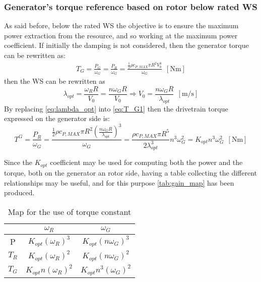 \subsubsection[Below rated WS]{Generator's torque reference based on rotor below rated WS}\label{subsec:below_rotor}
As said before, below the rated WS the objective is to ensure the maximum power extraction from the resource, and so working at the maximum power coefficient. If initially the damping is not considered, then the generator torque can be rewritten as:
\begin{gather}
    T_G=\frac{P_G}{\omega_G}=\frac{P_R}{\omega_G}=\frac{\frac{1}{2}\rho c_{P,MAX} \pi R^2 V_0^3}{\omega_G} \ \ \left[\si{\newton\meter}\right]
    \label{eq:T_G1}
\end{gather}
then the \acrshort{WS} can be rewritten as
\begin{equation}
    \lambda_{opt} = \frac{\omega_R R}{V_0} = \frac{n \omega_G R}{V_0} \Rightarrow V_0=\frac{n\omega_G R}{\lambda_{opt}}  \ \ \left[\si{\meter\per\second}\right]
    \label{eq:lambda_opt}
\end{equation}
By replacing \autoref{eq:lambda_opt} into \autoref{eq:T_G1} then the drivetrain torque expressed on the generator side is:
\begin{equation}
    T^G=\frac{P_R}{\omega_G}=\frac{\frac{1}{2}\rho c_{P,MAX} \pi R^2 \left(\frac{n\omega_G R}{\lambda_{opt}}\right)^3}{\omega_G} = \frac{\rho c_{P, MAX} \pi R^5 }{2 \lambda_{opt}^3}n^3\omega_G^{2} = K_{opt}n^3\omega_G^{2}  \ \ \left[\si{\newton\meter}\right]
    \label{eq:T_G2}
\end{equation}

Since the $K_{opt}$ coefficient may be used for computing both the power and the torque, both on the generator an rotor side, having a table collecting the different relationships may be useful, and for this purpose \autoref{tab:gain_map} has been produced.
\begin{table}[htb]
    \centering
    \caption{Map for the use of torque constant}
    \begin{tabular}{ccc}
    \toprule
         & $\omega_R$ & $\omega_G$  \\ \midrule
         P & $K_{opt} \left(\omega_{R}\right)^3$ & $K_{opt}\left(n \omega_{G}\right)^3$\\
         $T_R$ & $K_{opt} \left(\omega_{R}\right)^2$ & $K_{opt}\left(n \omega_{G}\right)^2$\\
         $T_G$ & $K_{opt} n \left(\omega_{R}\right)^2$ &  $K_{opt} n^3\left(\omega_{G}\right)^2$\\ \bottomrule
    \end{tabular}
    \label{tab:gain_map}
\end{table}

